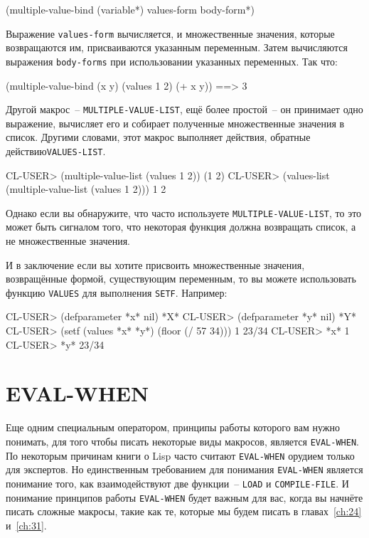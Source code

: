 \begin{myverb}
(multiple-value-bind (variable*) values-form
  body-form*)
\end{myverb}

Выражение \lstinline{values-form} вычисляется, и множественные значения, которые возвращаются
им, присваиваются указанным переменным.  Затем вычисляются выражения \lstinline{body-forms}
при использовании указанных переменных.  Так что:

\begin{myverb}
  (multiple-value-bind (x y) (values 1 2)
    (+ x y)) ==> 3
\end{myverb}

Другой макрос~-- \lstinline{MULTIPLE-VALUE-LIST}, ещё более простой~-- он принимает одно
выражение, вычисляет его и собирает полученные множественные значения в список.  Другими
словами, этот макрос выполняет действия, обратные действию\lstinline{VALUES-LIST}.

\begin{myverb}
  CL-USER> (multiple-value-list (values 1 2))
  (1 2)
  CL-USER> (values-list (multiple-value-list (values 1 2)))
  1
  2
\end{myverb}

Однако если вы обнаружите, что часто используете \lstinline{MULTIPLE-VALUE-LIST}, то это может
быть сигналом того, что некоторая функция должна возвращать список, а не множественные
значения.

И в заключение если вы хотите присвоить множественные значения, возвращённые формой,
существующим переменным, то вы можете использовать функцию \lstinline{VALUES} для выполнения
\lstinline{SETF}.  Например:

\begin{myverb}
  CL-USER> (defparameter *x* nil)
  *X*
  CL-USER> (defparameter *y* nil)
  *Y*
  CL-USER> (setf (values *x* *y*) (floor (/ 57 34)))
  1
  23/34
  CL-USER> *x*
  1
  CL-USER> *y*
  23/34
\end{myverb}

\section{EVAL-WHEN}

Еще одним специальным оператором, принципы работы которого вам нужно понимать, для того
чтобы писать некоторые виды макросов, является \lstinline{EVAL-WHEN}.  По некоторым
причинам книги о Lisp часто считают \lstinline{EVAL-WHEN} орудием только для экспертов.
Но единственным требованием для понимания \lstinline{EVAL-WHEN} является понимание того,
как взаимодействуют две функции~-- \lstinline{LOAD} и \lstinline{COMPILE-FILE}.  И
понимание принципов работы \lstinline{EVAL-WHEN} будет важным для вас, когда вы начнёте
писать сложные макросы, такие как те, которые мы будем писать в главах~\ref{ch:24}
и~\ref{ch:31}.

